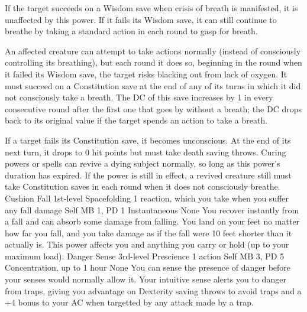 If the target succeeds on a Wisdom save when crisis of breath
is manifested, it is unaffected by this power. If it fails
its Wisdom save, it can still continue to breathe by taking
a standard action in each round to gasp for breath.

An affected creature can attempt to take actions normally
(instead of consciously controlling its breathing), but each
round it does so, beginning in the round when it failed its
Wisdom save, the target risks blacking out from lack of oxygen.
It must succeed on a Constitution save at the end of any of
its turns in which it did not consciously take a breath. The
DC of this save increases by 1 in every consecutive round
after the first one that goes by without a breath; the DC
drops back to its original value if the target spends an action
to take a breath.

If a target fails its Constitution save, it becomes unconscious.
At the end of its next turn, it drops to 0 hit points but
must take death saving throws. Curing powers or spells can
revive a dying subject normally, so long as this power's
duration has expired.
If the power is still in effect, a revived
creature still must take Constitution saves in each round
when it does not consciously breathe.
\DndPowerHeader%
    {Cushion Fall\label{pwr:cushion_fall}}
    {1st-level Spacefolding}
    {1 reaction, which you take when you suffer any fall damage}
    {Self}
    {MB 1, PD 1}
    {Instantaneous}
    {None}
You recover instantly from a fall and can
absorb some damage from falling. You land on your feet no
matter how far you fall, and you take damage as if the fall
were 10 feet shorter than it actually is. This power affects
you and anything you carry or hold (up to your maximum load).
\DndPowerHeader%
    {Danger Sense\label{pwr:danger_sense}}
    {3rd-level Prescience}
    {1 action}
    {Self}
    {MB 3, PD 5}
    {Concentration, up to 1 hour}
    {None}
You can sense the presence of danger before
your senses would normally allow it. Your intuitive sense
alerts you to danger from traps, giving you advantage on Dexterity
saving throws to avoid traps and a +4 bonus to your AC when
targetted by any attack made by a trap.

